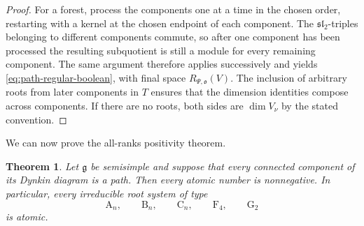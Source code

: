 \documentclass[11pt]{article}
\newtheorem{theorem}{Theorem}[section]
\theoremstyle{definition}
\theoremstyle{remark}
\newcommand{\typeA}{\ensuremath{\mathrm{A}}}
\newcommand{\typeB}{\ensuremath{\mathrm{B}}}
\newcommand{\typeC}{\ensuremath{\mathrm{C}}}
\newcommand{\typeF}{\ensuremath{\mathrm{F}}}
\newcommand{\typeG}{\ensuremath{\mathrm{G}}}
\begin{document}
\begin{proof}
For a forest, process the components one at a time in the chosen order,
restarting with a kernel at the chosen endpoint of each component.  The $\mathfrak{sl}_2$-triples belonging to
different components commute, so after one component has been processed the
resulting subquotient is still a module for every remaining component.  The
same argument therefore applies successively and yields
\eqref{eq:path-regular-boolean}, with final space $R_{\Psi,\mathfrak o}(V)$.
The inclusion of arbitrary roots from later components in $T$ ensures that
the dimension identities compose across components.  If there are no roots,
both sides are $\dim V_\nu$ by the stated convention.
\end{proof}

We can now prove the all-ranks positivity theorem.

\begin{theorem}\label{thm:path-positive}
Let $\mathfrak g$ be semisimple and suppose that every connected component of
its Dynkin diagram is a path.  Then every atomic number is nonnegative.
In particular, every irreducible root system of type
\[
       \typeA_n,\qquad \typeB_n,\qquad \typeC_n,
       \qquad \typeF_4,\qquad \typeG_2
\]
is atomic.
\end{theorem}
\end{document}
